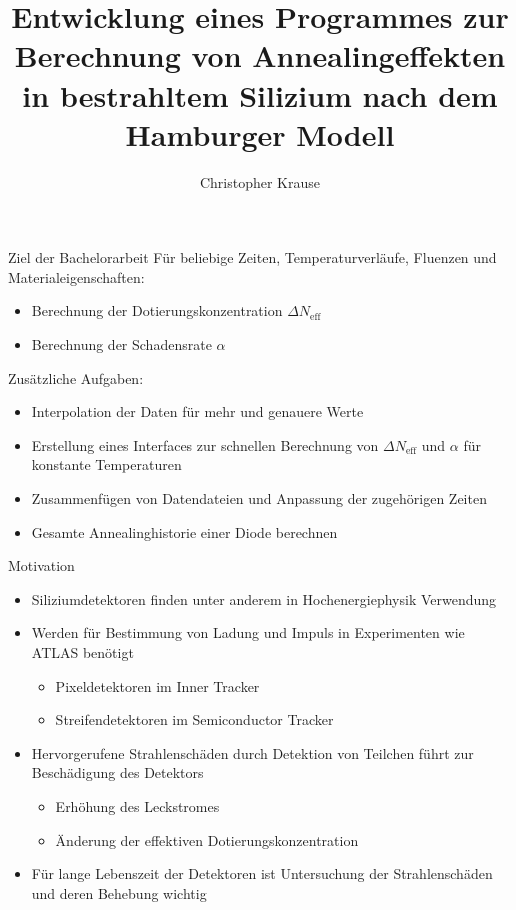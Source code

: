 \documentclass[aspectratio=1610, 9pt]{beamer}
\title{Entwicklung eines Programmes zur Berechnung von Annealingeffekten in bestrahltem Silizium nach dem Hamburger Modell}
\author[C.~Krause]{Christopher Krause}
\institute[E4]{Experimentelle Physik \\ Fakultät Physik}
\begin{document}
\maketitle

\begin{frame}{Ziel der Bachelorarbeit}
  Für beliebige Zeiten, Temperaturverläufe, Fluenzen und Materialeigenschaften:
  \begin{itemize}
    \item Berechnung der Dotierungskonzentration $\Delta N_{\mathrm{eff}}$
    \item Berechnung der Schadensrate $\alpha$
  \end{itemize}
  \medskip

  Zusätzliche Aufgaben:
  \begin{itemize}
    \item Interpolation der Daten für mehr und genauere Werte
    \item Erstellung eines Interfaces zur schnellen Berechnung von $\Delta N_{\mathrm{eff}}$ und $\alpha$
    für konstante Temperaturen
    \item Zusammenfügen von Datendateien und Anpassung der zugehörigen Zeiten
    \item Gesamte Annealinghistorie einer Diode berechnen
  \end{itemize}
\end{frame}


\begin{frame}{Motivation}
  \begin{itemize}
    \item Siliziumdetektoren finden unter anderem in Hochenergiephysik Verwendung
    \medskip
    \item Werden für Bestimmung von Ladung und Impuls in Experimenten wie ATLAS benötigt
      \begin{itemize}
        \item Pixeldetektoren im Inner Tracker
        \item Streifendetektoren im Semiconductor Tracker
      \end{itemize}
    \medskip
    \item Hervorgerufene Strahlenschäden durch Detektion von Teilchen führt zur Beschädigung des Detektors
      \begin{itemize}
        \item Erhöhung des Leckstromes
        \item Änderung der effektiven Dotierungskonzentration
      \end{itemize}
    \medskip
    \item Für lange Lebenszeit der Detektoren ist Untersuchung der Strahlenschäden und
          deren Behebung wichtig
  \end{itemize}
\end{frame}
\end{document}

